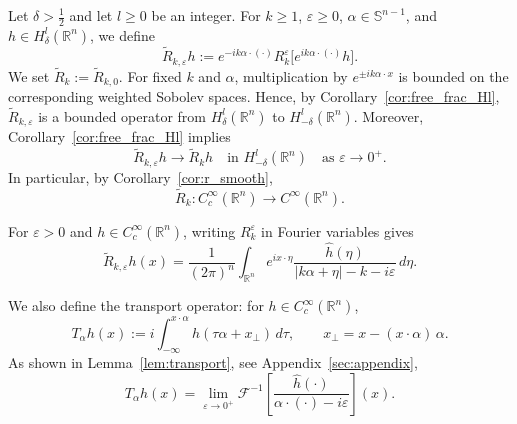 \documentclass[12pt,a4paper]{amsart}
\numberwithin{equation}{section}
\theoremstyle{plain}
\theoremstyle{definition}
\begin{document}
Let $\delta>\frac12$ and let $l\geq0$ be an integer. For $k\geq1$, $\varepsilon\geq0$, $\alpha\in\mathbb{S}^{n-1}$, and
$h\in H^l_\delta(\mathbb{R}^n)$, we define
\begin{equation}\label{eq:conj_identity}
    \widetilde{R}_{k,\varepsilon}h
    :=
    e^{-ik\alpha\cdot(\cdot)}
    R_k^\varepsilon
    \bigl[e^{ik\alpha\cdot(\cdot)}h\bigr].
\end{equation}
We set $\widetilde{R}_k:=\widetilde{R}_{k,0}$. For fixed $k$ and
$\alpha$, multiplication by $e^{\pm ik\alpha\cdot x}$ is bounded on the
corresponding weighted Sobolev spaces. Hence, by
Corollary~\ref{cor:free_frac_Hl},
$\widetilde{R}_{k,\varepsilon}$ is a bounded operator from
$H^l_\delta(\mathbb{R}^n)$ to $H^l_{-\delta}(\mathbb{R}^n)$.
Moreover, Corollary~\ref{cor:free_frac_Hl} implies
\begin{equation}\label{eq:amp_res_convergence}
    \widetilde{R}_{k,\varepsilon}h
    \longrightarrow
    \widetilde{R}_k h
    \quad\text{in }H^l_{-\delta}(\mathbb{R}^n)
    \quad\text{as }\varepsilon\to0^+.
\end{equation}
In particular, by Corollary~\ref{cor:r_smooth},
\begin{equation}\label{eq:r_smooth}
    \widetilde{R}_k :
    C_c^\infty(\mathbb{R}^n)
    \longrightarrow
    C^\infty(\mathbb{R}^n).
\end{equation}

For $\varepsilon>0$ and $h\in C_c^\infty(\mathbb{R}^n)$, writing
$R_k^\varepsilon$ in Fourier variables gives
\begin{equation}\label{eq:amp_res}
    \widetilde{R}_{k,\varepsilon} h(x)
    =
    \frac{1}{(2\pi)^n}
    \int_{\mathbb{R}^n}
    e^{ix\cdot\eta}
    \frac{\widehat{h}(\eta)}
    {|k\alpha+\eta|-k-i\varepsilon}
    \,d\eta.
\end{equation}

We also define the transport operator: for $h\in C_c^\infty(\mathbb{R}^n)$,
\begin{equation}\label{eq:transport_def}
  T_\alpha h(x)
  := i\int_{-\infty}^{x\cdot\alpha} h(\tau\alpha+x_\perp)\,d\tau,
  \qquad x_\perp = x-(x\cdot\alpha)\,\alpha.
\end{equation}
As shown in Lemma~\ref{lem:transport}, see Appendix~\ref{sec:appendix},
\begin{equation*}
    T_\alpha h(x)=\lim_{\varepsilon\to 0^+}
\mathcal{F}^{-1}\left[\frac{\widehat{h}(\cdot)}{\alpha\cdot(\cdot)-i\varepsilon}\right](x).
\end{equation*}
\end{document}
